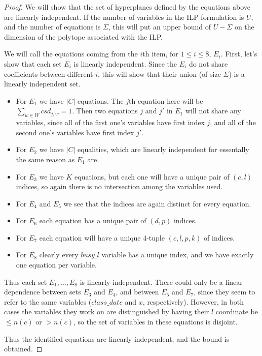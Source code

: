 \begin{proof}
We will show that the set of hyperplanes defined by the equations above are linearly independent. If the number of variables in the ILP formulation is $U$, and the number of equations is $\Sigma$, this will put an upper bound of $U - \Sigma$ on the dimension of the polytope associated with the ILP.

We will call the equations coming from the $i$th item, for $1 \le i \le 8$, $E_i$. First, let's show that each set $E_i$ is linearly independent. Since the $E_i$ do not share coefficients between different $i$, this will show that their union (of size $\Sigma$) is a linearly independent set.

\begin{itemize}
\item For $E_1$ we have $|C|$ equations. The $j$th equation here will be $\sum_{w \in W} csd_{j, w} = 1$. Then two equations $j$ and $j'$ in $E_1$ will not share any variables, since all of the first one's variables have first index $j$, and all of the second one's variables have first index $j'$.

\item For $E_2$ we have $|C|$ equalities, which are linearly independent for essentally the same reason as $E_1$ are.

\item For $E_3$ we have $K$ equations, but each one will have a unique pair of $(c, l)$ indices, so again there is no intersection among the variables used.

\item For $E_4$ and $E_5$  we see that the indices are again distinct for every equation.

\item For $E_6$ each equation has a unique pair of $(d, p)$ indices.

\item For $E_7$ each equation will have a unique 4-tuple $(c, l, p, k)$ of indices.

\item For $E_8$ clearly every $busy\_l$ variable has a unique index, and we have exactly one equation per variable.
\end{itemize}

Thus each set $E_1, \dots, E_8$ is linearly independent. There could only be a linear dependence between sets $E_3$ and $E_4$, and between $E_5$ and $E_7$, since they seem to refer to the same variables ($class\_date$ and $x$, respectively). However, in both cases the variables they work on are distinguished by having their $l$ coordinate be $\le n(c)$ or $> n(c)$, so the set of variables in these equations is disjoint.

Thus the identified equations are linearly independent, and the bound is obtained.
\end{proof}

